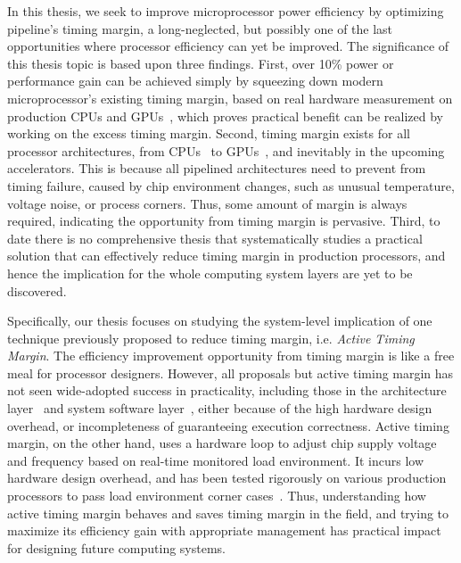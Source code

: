 In this thesis, we seek to improve microprocessor power efficiency by optimizing pipeline's timing margin, a long-neglected, but possibly one of the last opportunities where processor efficiency can yet be improved. The significance of this thesis topic is based upon three findings. First, over 10\% power or performance gain can be achieved simply by squeezing down modern microprocessor's existing timing margin, based on real hardware measurement on production CPUs and GPUs~\cite{reddi2010voltage, leng2015safe}, which proves practical benefit can be realized by working on the excess timing margin. Second, timing margin exists for all processor architectures, from CPUs~\cite{reddi2009voltage,reddi2010voltage} to GPUs~\cite{leng2014gpuvolt, leng2015gpu, leng2015safe}, and inevitably in the upcoming accelerators. This is because all pipelined architectures need to prevent from timing failure, caused by chip environment changes, such as unusual temperature, voltage noise, or process corners. Thus, some amount of margin is always required, indicating the opportunity from timing margin is pervasive. Third, to date there is no comprehensive thesis that systematically studies a practical solution that can effectively reduce timing margin in production processors, and hence the implication for the whole computing system layers are yet to be discovered.

Specifically, our thesis focuses on studying the system-level implication of one technique previously proposed to reduce timing margin, i.e. \textit{Active Timing Margin}. The efficiency improvement opportunity from timing margin is like a free meal for processor designers. However, all proposals but active timing margin has not seen wide-adopted success in practicality, including those in the architecture layer~\cite{grochowski2002microarchitectural,ernst2003razor,powell2003pipeline,gupta2008decor,gupta2009event, reddi2009voltage} and system software layer~\cite{reddi2010voltage,miller2012vrsync,leng2015safe, papadimitriou2017harnessing}, either because of the high hardware design overhead, or incompleteness of guaranteeing execution correctness. Active timing margin, on the other hand, uses a hardware loop to adjust chip supply voltage and frequency based on real-time monitored load environment. It incurs low hardware design overhead, and has been tested rigorously on various production processors to pass load environment corner cases~\cite{lefurgy2011active,bowman201222nm,tokunaga20145,grenat20145,bowman20158,webel2015robust,vezyrtzis2018droop,fischer200590nm}. Thus, understanding how active timing margin behaves and saves timing margin in the field, and trying to maximize its efficiency gain with appropriate management has practical impact for designing future computing systems.

